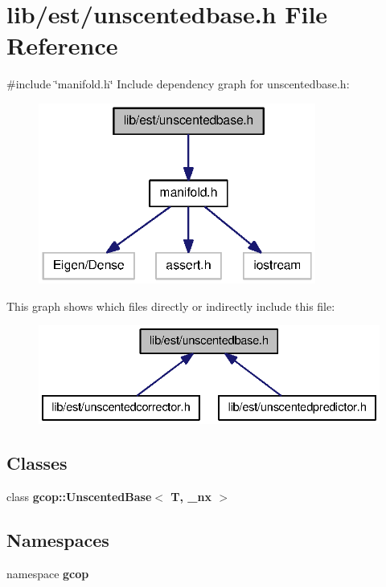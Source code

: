 \section{lib/est/unscentedbase.h \-File \-Reference}
\label{unscentedbase_8h}
{\ttfamily \#include \char`\"{}manifold.\-h\char`\"{}}\*
\-Include dependency graph for unscentedbase.\-h\-:
\nopagebreak
\begin{figure}[H]
\begin{center}
\leavevmode
\includegraphics[width=258pt]{unscentedbase_8h__incl}
\end{center}
\end{figure}
\-This graph shows which files directly or indirectly include this file\-:
\nopagebreak
\begin{figure}[H]
\begin{center}
\leavevmode
\includegraphics[width=334pt]{unscentedbase_8h__dep__incl}
\end{center}
\end{figure}
\subsection*{\-Classes}
\begin{DoxyCompactItemize}
\item 
class {\bf gcop\-::\-Unscented\-Base$<$ T, \-\_\-nx $>$}
\end{DoxyCompactItemize}
\subsection*{\-Namespaces}
\begin{DoxyCompactItemize}
\item 
namespace {\bf gcop}
\end{DoxyCompactItemize}
